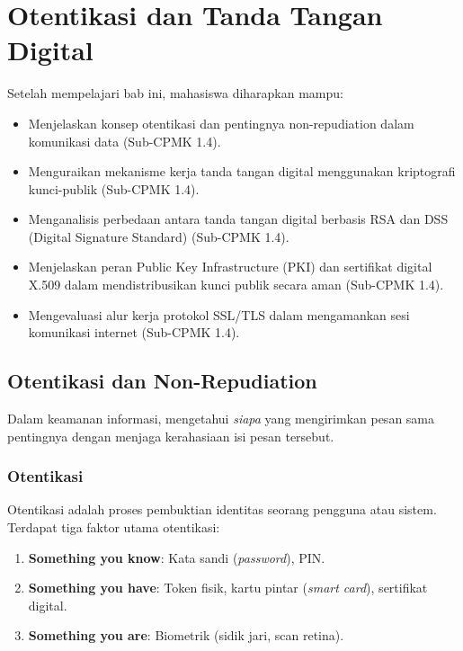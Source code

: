\documentclass[../main.tex]{subfiles}
\begin{document}
\chapter{Otentikasi dan Tanda Tangan Digital}

\begin{learningoutcome}
Setelah mempelajari bab ini, mahasiswa diharapkan mampu:
\begin{itemize}
    \item Menjelaskan konsep otentikasi dan pentingnya non-repudiation dalam komunikasi data (Sub-CPMK 1.4).
    \item Menguraikan mekanisme kerja tanda tangan digital menggunakan kriptografi kunci-publik (Sub-CPMK 1.4).
    \item Menganalisis perbedaan antara tanda tangan digital berbasis RSA dan DSS (Digital Signature Standard) (Sub-CPMK 1.4).
    \item Menjelaskan peran Public Key Infrastructure (PKI) dan sertifikat digital X.509 dalam mendistribusikan kunci publik secara aman (Sub-CPMK 1.4).
    \item Mengevaluasi alur kerja protokol SSL/TLS dalam mengamankan sesi komunikasi internet (Sub-CPMK 1.4).
\end{itemize}
\end{learningoutcome}

\section{Otentikasi dan Non-Repudiation}
Dalam keamanan informasi, mengetahui \textit{siapa} yang mengirimkan pesan sama pentingnya dengan menjaga kerahasiaan isi pesan tersebut.

\subsection{Otentikasi}
Otentikasi adalah proses pembuktian identitas seorang pengguna atau sistem. Terdapat tiga faktor utama otentikasi:
\begin{enumerate}
    \item \textbf{Something you know}: Kata sandi (\textit{password}), PIN.
    \item \textbf{Something you have}: Token fisik, kartu pintar (\textit{smart card}), sertifikat digital.
    \item \textbf{Something you are}: Biometrik (sidik jari, scan retina).
\end{enumerate}
\end{document}
